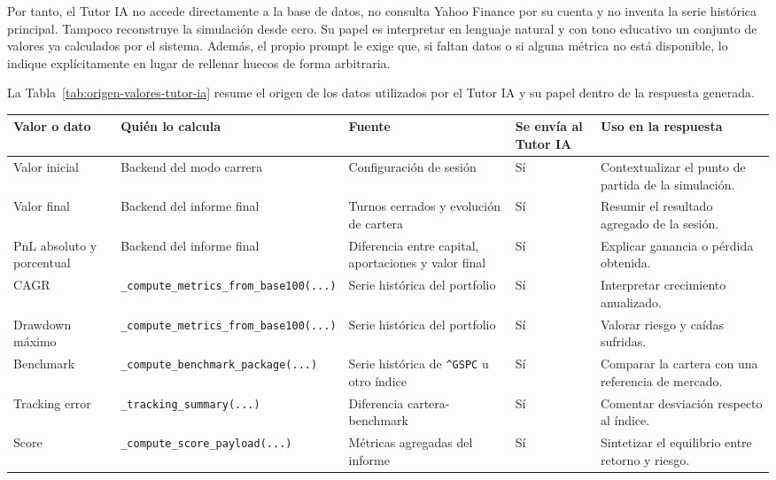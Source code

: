 Por tanto, el Tutor IA no accede directamente a la base de datos, no consulta Yahoo Finance por su cuenta y no inventa la serie histórica principal. Tampoco reconstruye la simulación desde cero. Su papel es interpretar en lenguaje natural y con tono educativo un conjunto de valores ya calculados por el sistema. Además, el propio prompt le exige que, si faltan datos o si alguna métrica no está disponible, lo indique explícitamente en lugar de rellenar huecos de forma arbitraria.

La Tabla~\ref{tab:origen-valores-tutor-ia} resume el origen de los datos utilizados por el Tutor IA y su papel dentro de la respuesta generada.

\begin{table}[htbp]
\centering
\small
\renewcommand{\arraystretch}{1.15}
\begin{tabular}{|p{}|p{}|p{}|p{}|p{}|}
\hline
\textbf{Valor o dato} & \textbf{Quién lo calcula} & \textbf{Fuente} & \textbf{Se envía al Tutor IA} & \textbf{Uso en la respuesta} \\ \hline
Valor inicial & Backend del modo carrera & Configuración de sesión & Sí & Contextualizar el punto de partida de la simulación. \\ \hline
Valor final & Backend del informe final & Turnos cerrados y evolución de cartera & Sí & Resumir el resultado agregado de la sesión. \\ \hline
PnL absoluto y porcentual & Backend del informe final & Diferencia entre capital, aportaciones y valor final & Sí & Explicar ganancia o pérdida obtenida. \\ \hline
CAGR & \texttt{\_compute\_metrics\_from\_base100(...)} & Serie histórica del portfolio & Sí & Interpretar crecimiento anualizado. \\ \hline
Drawdown máximo & \texttt{\_compute\_metrics\_from\_base100(...)} & Serie histórica del portfolio & Sí & Valorar riesgo y caídas sufridas. \\ \hline
Benchmark & \texttt{\_compute\_benchmark\_package(...)} & Serie histórica de \texttt{\^{}GSPC} u otro índice & Sí & Comparar la cartera con una referencia de mercado. \\ \hline
Tracking error & \texttt{\_tracking\_summary(...)} & Diferencia cartera-benchmark & Sí & Comentar desviación respecto al índice. \\ \hline
Score & \texttt{\_compute\_score\_payload(...)} & Métricas agregadas del informe & Sí & Sintetizar el equilibrio entre retorno y riesgo. \\ \hline

\end{tabular}
\end{table}
